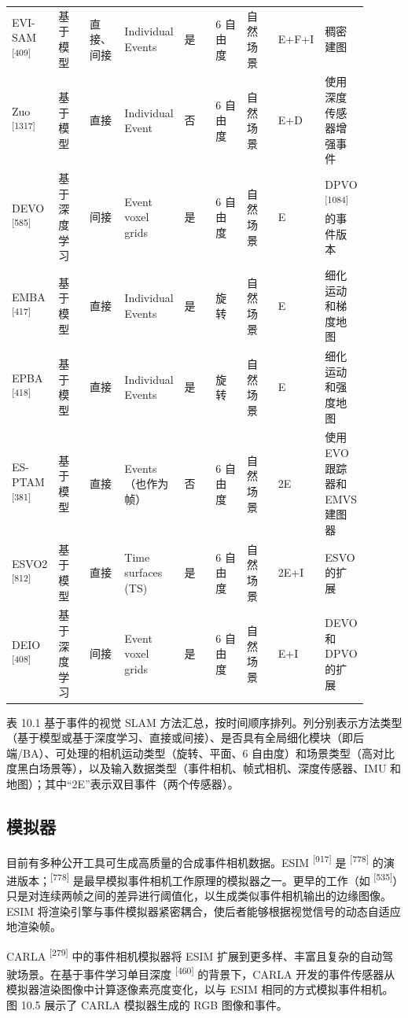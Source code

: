 \begin{longtable}{p{0.100\linewidth}p{0.100\linewidth}p{0.100\linewidth}p{0.100\linewidth}p{0.100\linewidth}p{0.100\linewidth}p{0.100\linewidth}p{0.100\linewidth}p{0.100\linewidth}}
EVI-SAM \textsuperscript{[409]} & 基于模型 & 直接、间接 & Individual Events & 是 & 6 自由度 & 自然场景 & E+F+I & 稠密建图 \\
Zuo \textsuperscript{[1317]} & 基于模型 & 直接 & Individual Event & 否 & 6 自由度 & 自然场景 & E+D & 使用深度传感器增强事件 \\
DEVO \textsuperscript{[585]} & 基于深度学习 & 间接 & Event voxel grids & 是 & 6 自由度 & 自然场景 & E & DPVO \textsuperscript{[1084]} 的事件版本 \\
EMBA \textsuperscript{[417]} & 基于模型 & 直接 & Individual Events & 是 & 旋转 & 自然场景 & E & 细化运动和梯度地图 \\
EPBA \textsuperscript{[418]} & 基于模型 & 直接 & Individual Events & 是 & 旋转 & 自然场景 & E & 细化运动和强度地图 \\
ES-PTAM \textsuperscript{[381]} & 基于模型 & 直接 & Events（也作为帧） & 否 & 6 自由度 & 自然场景 & 2E & 使用 EVO 跟踪器和 EMVS 建图器 \\
ESVO2 \textsuperscript{[812]} & 基于模型 & 直接 & Time surfaces (TS) & 是 & 6 自由度 & 自然场景 & 2E+I & ESVO 的扩展 \\
DEIO \textsuperscript{[408]} & 基于深度学习 & 间接 & Event voxel grids & 是 & 6 自由度 & 自然场景 & E+I & DEVO 和 DPVO 的扩展 \\
\bottomrule
\end{longtable}

表 10.1 基于事件的视觉 SLAM 方法汇总，按时间顺序排列。列分别表示方法类型（基于模型或基于深度学习、直接或间接）、是否具有全局细化模块（即后端/BA）、可处理的相机运动类型（旋转、平面、6 自由度）和场景类型（高对比度黑白场景等），以及输入数据类型（事件相机、帧式相机、深度传感器、IMU 和地图）；其中“2E”表示双目事件（两个传感器）。

\subsection{模拟器}

目前有多种公开工具可生成高质量的合成事件相机数据。ESIM \textsuperscript{[917]} 是 \textsuperscript{[778]} 的演进版本；\textsuperscript{[778]} 是最早模拟事件相机工作原理的模拟器之一。更早的工作（如 \textsuperscript{[535]}）只是对连续两帧之间的差异进行阈值化，以生成类似事件相机输出的边缘图像。ESIM 将渲染引擎与事件模拟器紧密耦合，使后者能够根据视觉信号的动态自适应地渲染帧。

CARLA \textsuperscript{[279]} 中的事件相机模拟器将 ESIM 扩展到更多样、丰富且复杂的自动驾驶场景。在基于事件学习单目深度 \textsuperscript{[460]} 的背景下，CARLA 开发的事件传感器从模拟器渲染图像中计算逐像素亮度变化，以与 ESIM 相同的方式模拟事件相机。图 10.5 展示了 CARLA 模拟器生成的 RGB 图像和事件。

